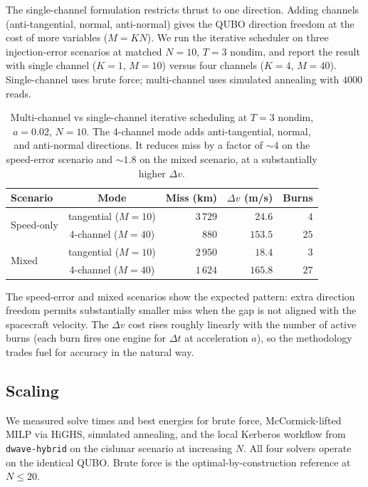 \documentclass[11pt,a4paper]{article}
\theoremstyle{plain}
\begin{document}
The single-channel formulation restricts thrust to one direction.
Adding channels (anti-tangential, normal, anti-normal) gives the
QUBO direction freedom at the cost of more variables ($M = K N$).
We run the iterative scheduler on three injection-error scenarios
at matched $N = 10$, $T = 3$ nondim, and report the result with
single channel ($K = 1$, $M = 10$) versus four channels
($K = 4$, $M = 40$). Single-channel uses brute force; multi-channel
uses simulated annealing with $4000$ reads.

\begin{table}[htbp]
\centering
\begin{tabular}{lcrrr}
\toprule
Scenario & Mode & Miss (km) & $\Delta v$ (m/s) & Burns \\
\midrule
\multirow{2}{*}{Speed-only}
  & tangential ($M{=}10$) & $3\,729$ & $24.6$ & $4$ \\
  & 4-channel ($M{=}40$) & $880$ & $153.5$ & $25$ \\
\multirow{2}{*}{Mixed}
  & tangential ($M{=}10$) & $2\,950$ & $18.4$ & $3$ \\
  & 4-channel ($M{=}40$) & $1\,624$ & $165.8$ & $27$ \\
\bottomrule
\end{tabular}
\caption{Multi-channel vs single-channel iterative scheduling at
$T = 3$ nondim, $a = 0.02$, $N = 10$. The 4-channel mode adds
anti-tangential, normal, and anti-normal directions. It reduces
miss by a factor of $\sim 4$ on the speed-error scenario and
$\sim 1.8$ on the mixed scenario, at a substantially higher
$\Delta v$.}
\label{tab:multi-channel}
\end{table}

The speed-error and mixed scenarios show the expected pattern:
extra direction freedom permits substantially smaller miss when
the gap is not aligned with the spacecraft velocity. The
$\Delta v$ cost rises roughly linearly with the number of active
burns (each burn fires one engine for $\Delta t$ at acceleration
$a$), so the methodology trades fuel for accuracy in the natural
way. 

\subsection{Scaling}\label{sec:scaling}

We measured solve times and best
energies for brute force, McCormick-lifted MILP via HiGHS,
simulated annealing, and the local Kerberos workflow from
\texttt{dwave-hybrid} on the cislunar scenario at increasing $N$.
All four solvers operate on the identical QUBO. Brute force is
the optimal-by-construction reference at $N \le 20$.
\end{document}

